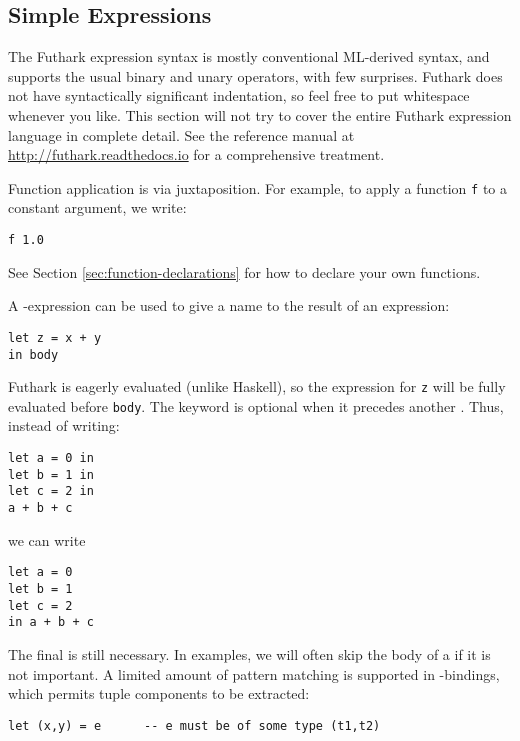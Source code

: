 \documentclass[oneside,11pt]{book}
\begin{document}
\subsection{Simple Expressions}

The Futhark expression syntax is mostly conventional ML-derived
syntax, and supports the usual binary and unary operators, with few
surprises.  Futhark does not have syntactically significant
indentation, so feel free to put whitespace whenever you like.  This
section will not try to cover the entire Futhark expression language
in complete detail.  See the reference manual at
\url{http://futhark.readthedocs.io} for a comprehensive treatment.

Function application is via juxtaposition.  For example, to apply a
function \texttt{f} to a constant argument, we write:

\begin{lstlisting}
f 1.0
\end{lstlisting}

\noindent
See Section \ref{sec:function-declarations} for how to declare your
own functions.

A -expression can be used to give a name to the result of
an expression:

\begin{lstlisting}
let z = x + y
in body
\end{lstlisting}

Futhark is eagerly evaluated (unlike Haskell), so the expression for
\texttt{z} will be fully evaluated before \texttt{body}.  The  keyword is optional when it precedes another
.  Thus, instead of writing:

\begin{lstlisting}
let a = 0 in
let b = 1 in
let c = 2 in
a + b + c
\end{lstlisting}

\noindent
we can write

\begin{lstlisting}
let a = 0
let b = 1
let c = 2
in a + b + c
\end{lstlisting}

\noindent
The final  is still necessary.  In examples, we will often
skip the body of a  if it is not important.  A limited
amount of pattern matching is supported in -bindings,
which permits tuple components to be extracted:

\begin{lstlisting}
let (x,y) = e      -- e must be of some type (t1,t2)
\end{lstlisting}
\end{document}
